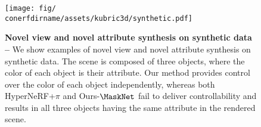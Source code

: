 \begin{figure}
  \centering
  \texttt{[image: fig/\\conerfdirname/assets/kubric3d/synthetic.pdf]}
  \caption{{\bf Novel view and novel attribute synthesis on synthetic data -- }
    We show examples of novel view and novel attribute synthesis on synthetic
    data.
    The scene is composed of three objects, where the color of each object is
    their attribute.
    Our method provides control over the color of each object independently,
    whereas both HyperNeRF{+}$\pi$ and Ours{-}$\MaskNet$ fail to deliver
    controllability and results in all three objects having the same attribute
    in the rendered scene.
  }
  \label{fig:conerf-kubric3d}
\end{figure}